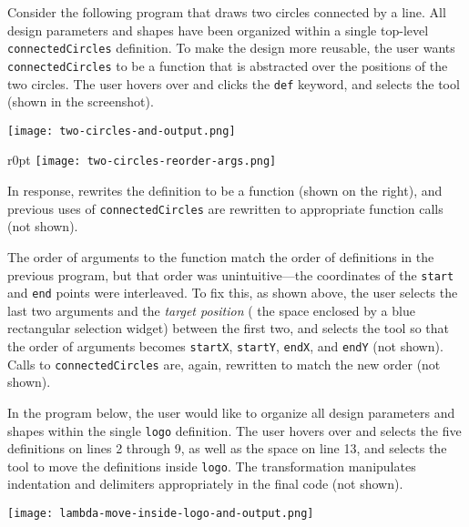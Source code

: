 
Consider the following program that draws two circles connected by a line.
All design parameters and shapes have been organized within
a single top-level \verb+connectedCircles+ definition.
%
To make the design more reusable, the user wants
\verb+connectedCircles+ to be a function that is abstracted over the positions
of the two circles.
The user hovers over and clicks the \verb+def+ keyword, and selects the  tool
(shown in the screenshot).

\begin{center}
\texttt{[image: two-circles-and-output.png]}
\end{center}

\begin{wrapfigure}{r}{0pt}
\texttt{[image: two-circles-reorder-args.png]}
\end{wrapfigure}
%
\noindent
In response, 
rewrites the definition
to be a function (shown on the right), and
previous uses of \verb+connectedCircles+ are rewritten to
appropriate function calls (not shown).

The order of arguments to the function match the order of definitions
in the previous program, but that order was unintuitive---the coordinates of the
\verb+start+ and \verb+end+ points were interleaved. To fix this, as shown above, the
user selects the last two arguments and the \emph{target position} (\ie{} the
space enclosed by a blue rectangular selection widget) between the first two, and
selects the  tool so that the order of arguments becomes
\verb+startX+, \verb+startY+, \verb+endX+, and \verb+endY+ (not shown).
Calls to \verb+connectedCircles+ are, again, rewritten to match the new order
(not shown).



In the program below, the user would like to organize all design parameters and
shapes within the single \verb+logo+ definition. The user hovers over and
selects the five definitions on lines 2 through 9, as well as the space
on line 13, and selects the  tool to move the definitions inside
\verb+logo+. The transformation manipulates indentation and
delimiters appropriately in the final code (not shown).

\vspace{2pt} %

\begin{center}
\texttt{[image: lambda-move-inside-logo-and-output.png]}
\end{center}
